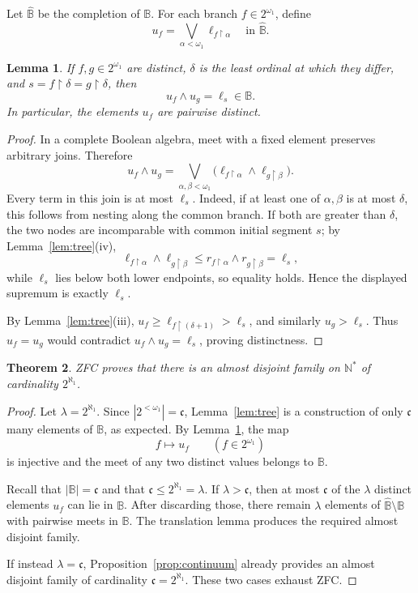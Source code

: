 \documentclass[11pt]{article}
\newtheorem{theorem}{Theorem}[section]
\newtheorem{lemma}[theorem]{Lemma}
\theoremstyle{definition}
\theoremstyle{remark}
\newcommand{\B}{\mathbb B}
\newcommand{\wideB}{\widehat{\mathbb B}}
\newcommand{\restr}{\mathbin{\upharpoonright}}
\begin{document}
Let \(\wideB\) be the completion of \(\B\).  For each branch
\(f\in2^{\omega_1}\), define
\[
  u_f=\bigvee_{\alpha<\omega_1}\ell_{f\restr\alpha}
  \quad\text{in }\wideB.
\]

\begin{lemma}\label{lem:branchmeet}
If \(f,g\in2^{\omega_1}\) are distinct, \(\delta\) is the least ordinal at
which they differ, and \(s=f\restr\delta=g\restr\delta\), then
\[
  u_f\wedge u_g=\ell_s\in\B.
\]
In particular, the elements \(u_f\) are pairwise distinct.
\end{lemma}

\begin{proof}
In a complete Boolean algebra, meet with a fixed element preserves arbitrary
joins.  Therefore
\[
  u_f\wedge u_g
  =\bigvee_{\alpha,\beta<\omega_1}
     \bigl(\ell_{f\restr\alpha}
           \wedge\ell_{g\restr\beta}\bigr).
\]
Every term in this join is at most \(\ell_s\).  Indeed, if at least one of
\(\alpha,\beta\) is at most \(\delta\), this follows from nesting along the
common branch.  If both are greater than \(\delta\), the two nodes are
incomparable with common initial segment \(s\); by
Lemma~\ref{lem:tree}(iv),
\[
  \ell_{f\restr\alpha}\wedge\ell_{g\restr\beta}
  \leq r_{f\restr\alpha}\wedge r_{g\restr\beta}
  =\ell_s,
\]
while \(\ell_s\) lies below both lower endpoints, so equality holds.  Hence
the displayed supremum is exactly \(\ell_s\).

By Lemma~\ref{lem:tree}(iii),
\(u_f\geq\ell_{f\restr(\delta+1)}>\ell_s\), and similarly
\(u_g>\ell_s\).  Thus \(u_f=u_g\) would contradict
\(u_f\wedge u_g=\ell_s\), proving distinctness.
\end{proof}

\begin{theorem}\label{thm:main}
ZFC proves that there is an almost disjoint family on \(\mathbb N^*\) of
cardinality \(2^{\aleph_1}\).
\end{theorem}

\begin{proof}
Let \(\lambda=2^{\aleph_1}\).  Since
\(|2^{<\omega_1}|=\mathfrak c\), Lemma~\ref{lem:tree} is a construction of
only \(\mathfrak c\) many elements of \(\B\), as expected.  By
Lemma~\ref{lem:branchmeet}, the map
\[
  f\longmapsto u_f
  \qquad(f\in2^{\omega_1})
\]
is injective and the meet of any two distinct values belongs to \(\B\).

Recall that \(|\B|=\mathfrak c\) and that
\(\mathfrak c\leq2^{\aleph_1}=\lambda\).  If \(\lambda>\mathfrak c\), then
at most \(\mathfrak c\) of the \(\lambda\) distinct elements \(u_f\) can lie
in \(\B\).  After discarding those, there remain \(\lambda\) elements of
\(\wideB\setminus\B\) with pairwise meets in \(\B\).  The translation lemma
produces the required almost disjoint family.

If instead \(\lambda=\mathfrak c\), Proposition~\ref{prop:continuum} already
provides an almost disjoint family of cardinality
\(\mathfrak c=2^{\aleph_1}\).  These two cases exhaust ZFC.
\end{proof}
\end{document}
